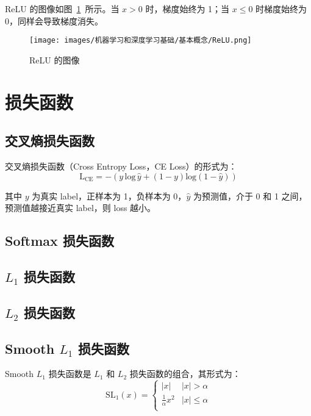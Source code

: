 ReLU 的图像如图~\ref{fig:ReLU}~所示。当 $x > 0$ 时，梯度始终为 1；当 $x \leq 0$
时梯度始终为 0，同样会导致梯度消失。

\begin{figure}[ht]
  \centering
  \texttt{[image: images/机器学习和深度学习基础/基本概念/ReLU.png]}
  \caption{ReLU 的图像}
  \label{fig:ReLU}
\end{figure}

\section{损失函数}

\subsection{交叉熵损失函数}
\label{subsec:CELoss}

交叉熵损失函数（Cross Entropy Loss，CE Loss）的形式为：
\begin{equation}
  \label{equ:CELoss}
  \mathrm{L}_{\mathrm{CE}} = - \left( y \, \mathrm{log} \, \hat{y} + (1-y) \mathrm{log} (1-\hat{y}) \right )
\end{equation}

其中 $y$ 为真实 label，正样本为 1，负样本为 0，$\hat{y}$ 为预测值，介于 0 和 1
之间，预测值越接近真实 label，则 loss 越小。

\subsection{Softmax 损失函数}

\subsection{$L_1$ 损失函数}

\subsection{$L_2$ 损失函数}

\subsection{Smooth $L_1$ 损失函数}
Smooth $L_1$ 损失函数是 $L_1$ 和 $L_2$ 损失函数的组合，其形式为：
\begin{equation}
  \label{equ:SmoothL1}
  \mathrm{SL}_1(x) = \left\{
    \begin{array}{lr}
      |x| & |x| > \alpha \\
      \frac{1}{\alpha} x^2 & |x| \leq \alpha \\
    \end{array}
  \right.
\end{equation}

